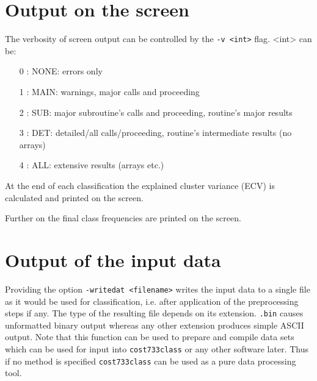 \documentclass[12pt, oneside, a4paper, headsepline, plainheadsepline]{scrbook}
\begin{document}

\section{Output on the screen}
The verbosity of screen output can be controlled by the \verb+-v <int>+ flag. <int> can be:
\begin{itemize}
\item[0]: NONE: errors only
\item[1]: MAIN: warnings, major calls and proceeding
\item[2]: SUB: major subroutine's calls and proceeding, routine's major results
\item[3]: DET: detailed/all calls/proceeding, routine's intermediate results (no arrays)
\item[4]: ALL: extensive results (arrays etc.)
\end{itemize}

At the end of each classification the explained cluster variance (ECV) is calculated and printed on the screen.


Further on the final class frequencies are printed on the screen.

\section{Output of the input data}
Providing the option \verb+-writedat <filename>+ writes the input data to a single file as it would be used for 
classification, i.e. after application of the preprocessing steps if any. The type of the resulting file depends on its extension. \verb+.bin+ causes unformatted binary output whereas any other extension produces simple ASCII output.  Note that this function can be used to 
prepare and compile data sets which can be used for input into \verb+cost733class+ or any other software later.
Thus if no method is specified \verb+cost733class+ can be used as a pure data processing tool.
\end{document}
